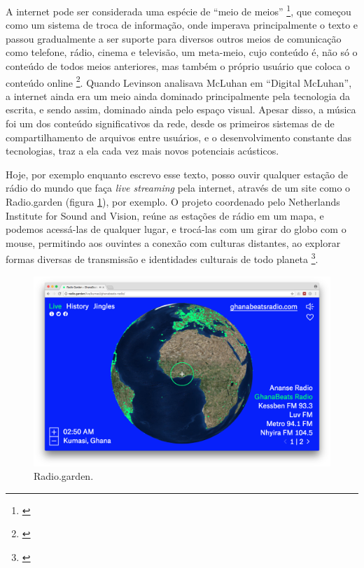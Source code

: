     A internet pode ser considerada uma espécie de ``meio de meios'' \footnote{\cite[5]{Levinson2001}}, que começou como um sistema de troca de informação, onde imperava principalmente o texto e passou gradualmente a ser suporte para diversos outros  meios de comunicação como telefone, rádio, cinema e televisão, um meta-meio, cujo conteúdo é, não só o conteúdo de todos meios anteriores, mas também o próprio usuário que coloca o conteúdo online \footnote{\cite[39]{Levinson2001}}. Quando Levinson analisava McLuhan em ``Digital McLuhan'', a internet ainda era um meio ainda dominado principalmente pela tecnologia da escrita, e sendo assim, dominado ainda pelo espaço visual. Apesar disso, a música foi um dos conteúdo significativos da rede, desde os primeiros sistemas de de compartilhamento de arquivos entre usuários, e o desenvolvimento constante das tecnologias, traz a ela cada vez mais novos potenciais acústicos.
    
Hoje, por exemplo enquanto escrevo esse texto, posso ouvir qualquer estação de rádio do mundo que faça \emph{live streaming} pela internet, através de um site como o Radio.garden (figura \ref{radiogarden}), por exemplo. O projeto coordenado pelo Netherlands Institute for Sound and Vision, reúne as estações de rádio em um mapa, e podemos acessá-las de qualquer lugar, e trocá-las com um girar do globo com o mouse, permitindo aos ouvintes a conexão com culturas distantes, ao explorar formas diversas de transmissão e identidades culturais de todo planeta \footnote{\cite{caroline2016radio}}. 

\begin{figure}[htb]
    \caption{\label{radiogarden} Radio.garden.}
    \begin{center}
        \includegraphics[width=1\linewidth]{pictures/radio_garden_2018-06-10.png}
    \end{center}
    
\end{figure}

